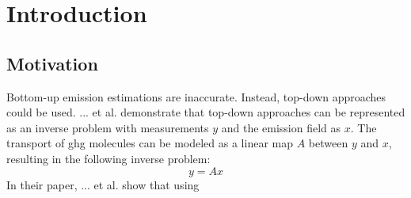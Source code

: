 
\chapter{Introduction}\label{chapter:introduction}

\section{Motivation}
Bottom-up emission estimations are inaccurate.
Instead, top-down approaches could be used.
... et al. demonstrate that top-down approaches can be represented as an inverse problem with measurements $y$ and the emission field as $x$.
The transport of ghg molecules can be modeled as a linear map $A$ between $y$ and $x$, resulting in the following inverse problem:
\begin{equation}
	y = Ax
\end{equation}
In their paper, ... et al. show that using

